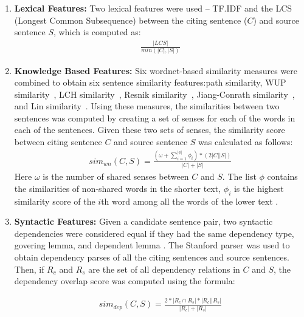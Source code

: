\documentclass[11pt]{article}
\begin{document}
\begin{enumerate}
\item{\bf Lexical Features:} Two lexical features were used -- TF.IDF and the LCS (Longest Common Subsequence) between the citing sentence ($C$) and source sentence $S$, which is computed as:
\vspace{-.3cm}
\begin{eqnarray*}
  \frac{|LCS|}{min(|C|,|S|)}
\end{eqnarray*}
\item{\bf Knowledge Based Features:} Six wordnet-based similarity measures were combined to obtain six sentence similarity features\cite{Banea2012}:path similarity, WUP similarity~\cite{Wu:1994:VSL:981732.981751}, LCH similarity~\cite{leacock1998combining}, Resnik similarity~\cite{Resnik:1995:UIC:1625855.1625914}, Jiang-Conrath similarity~\cite{Jiang97taxonomySimilarity}, and Lin similarity~\cite{Lin:1998:IDS:645527.657297}. 
Using these measures, the similarities between two sentences was computed by creating a set of senses for each of the words in each of the sentences. Given these two sets of senses, the similarity score between citing sentence $C$ and source sentence $S$ was calculated as follows:
\vspace{-.3cm}
\begin{eqnarray*}
  sim_{wn}(C,S) = \frac{(\omega + \sum_{i=1}^{|\phi|}\phi_i) * (2|C||S|)}{|C|+|S|}
\end{eqnarray*}
Here $\omega$ is the number of shared senses between $C$ and $S$. The list $\phi$ contains the similarities of non-shared words in the shorter text, $\phi_i$ is the highest similarity score of the $i$th word among all the words of the lower text \cite{S13-1017}. 
\item{\bf Syntactic Features:} Given a candidate sentence pair, two syntactic dependencies were considered equal if they had the same dependency type, govering lemma, and dependent lemma \cite{S13-1017}. The Stanford parser was used to obtain dependency parses of all the citing sentences and source sentences. Then, if $R_c$ and $R_s$ are the set of all dependency relations in $C$ and $S$, the dependency overlap score was computed using the formula:

\vspace{-.3cm}
\begin{eqnarray*}
  sim_{dep}(C,S) = \frac{2*|R_c \cap R_s| * |R_c||R_s|}{|R_c|+|R_s|}
\end{eqnarray*}
\end{enumerate}
 
\end{document}
